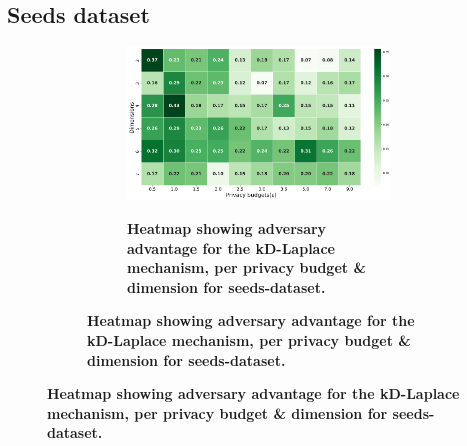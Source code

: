 {\subsection{Seeds dataset}
\begin{figure}[H]
  \centering
  \begin{subfigure}[b]{0.75\textwidth}
    \begin{subfigure}[c]{1\textwidth}
      \caption{\textbf{Heatmap showing adversary advantage for the kD-Laplace mechanism, per privacy budget \& dimension for seeds-dataset.}}
      \includegraphics[width=1\textwidth]{Results/nd-laplace/nd-Laplace/seeds-dataset/shokri_mi_adv.png}
      \label{fig:privacy_seeds-dataset_adversial_advantage_kd-laplace}
    \end{subfigure}
    \vfill %


\end{subfigure}
\end{figure}}
